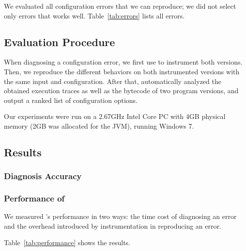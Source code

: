 We evaluated all configuration errors that we can reproduce;
we did not select only errors that \ourtool works well.
Table~\ref{tab:errors} lists all errors.

\subsection{Evaluation Procedure}


When diagnosing a configuration error, we first use
\ourtool to instrument both versions. Then, we reproduce
the different behaviors on both instrumented versions with 
the same input and configuration. After that, \ourtool automatically
analyzed the obtained execution traces as well as the
bytecode of two program versions, and output a ranked
list of configuration options.

Our experiments were run on a 2.67GHz Intel Core PC
with 4GB physical memory (2GB was allocated for the JVM),
running Windows 7.

\subsection{Results}

\subsubsection{Diagnosis Accuracy}
\label{sec:accuracy}

\subsubsection{Performance of \ourtool}
\label{sec:timecost}

We measured \ourtool's performance in two ways:
the time cost of diagnosing an error and
the overhead introduced by instrumentation
in reproducing an error.

Table~\ref{tab:performance} shows the results.


